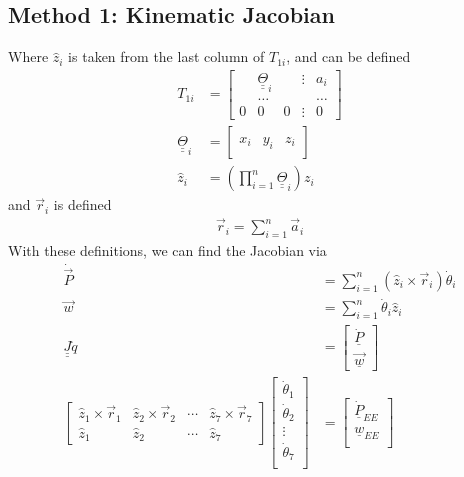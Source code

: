 \documentclass{article}
\def\du#1{\underline{\underline{#1}}}
\begin{document}
\subsection{Method 1: Kinematic Jacobian}
Where $\hat{z}_i$ is taken from the last column of $T_{1i}$, and can be defined
\begin{align*}
T_{1i} &=
\left[\begin{matrix}
  & \du{\Theta}_i &   & \vdots & a_i \\
  & \hdots   &   &        & \hdots \\
0 &        0 & 0 & \vdots & 0
\end{matrix}\right] \\
\du{\Theta}_i &=
\left[\begin{matrix}
& & \\
x_i & y_i & z_i \\
& &
\end{matrix}\right] \\
\hat{z}_i &= \left( \prod_{i=1}^n \du{\Theta}_i \right) z_i
\end{align*}
and $\vec{r}_i$ is defined
\begin{align*}
\vec{r}_i = \sum_{i=1}^n \vec{a}_i
\end{align*}
With these definitions, we can find the Jacobian via
\begin{align*}
\dot{\vec{P}} &= \sum_{i=1}^{n} \left( \hat{z}_i \times \vec{r}_i \right) \dot{\theta}_i \\
\vec{w} &= \sum_{i=1}^{n} \dot{\theta}_i \hat{z}_i \\
\du{J} \dot{q} &=
\left[\begin{matrix}
\underline{\dot{P}} \\
\underline{\vec{w}}
\end{matrix}\right] \\
\left[\begin{matrix}
\hat{z}_1 \times \vec{r}_1 & \hat{z}_2 \times \vec{r}_2 & \cdots & \hat{z}_7 \times \vec{r}_7 \\
\hat{z}_1 & \hat{z}_2 & \cdots & \hat{z}_7
\end{matrix}\right]
\left[\begin{matrix}
\dot{\theta}_1 \\
\dot{\theta}_2 \\
\vdots \\
\dot{\theta}_7 \\
\end{matrix}\right]
&=
\left[\begin{matrix}
\underline{\dot{P}}_{EE} \\
\underline{w}_{EE} \\
\end{matrix}\right] \\
\end{align*}
\end{document}
